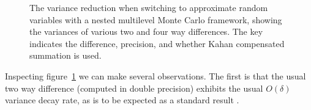 \documentclass[manuscript,review]{acmart}
\begin{document}
\begin{figure}[htb]
\centering

\hfil
{}\hfil
{}\hfil


\caption{The variance reduction when switching to approximate random variables with a nested multilevel Monte Carlo framework, showing the variances of various two and four way differences. The key indicates the difference, precision, and whether Kahan compensated summation is used.}
\label{fig:four_way_variance}
\end{figure}

Inspecting figure~\ref{fig:four_way_variance} we can make several observations. The first is that the usual two way difference (computed in double precision) exhibits the usual $ O(\delta) $ variance decay rate, as is to be expected as a standard result \citep{kloeden1999numerical,glasserman2013monte}. 
\end{document}
